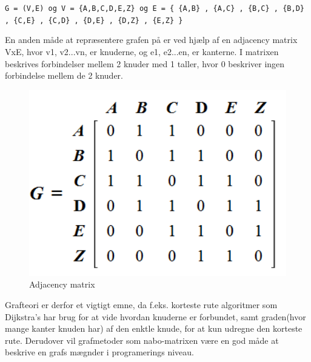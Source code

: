 \verb!G = (V,E) og V = {A,B,C,D,E,Z} og E = { {A,B} , {A,C} , {B,C} , {B,D} , {C,E} , {C,D} , {D,E} , {D,Z} , {E,Z} }!

\vspace{5mm}

En anden måde at repræsentere grafen på er ved hjælp af en adjacency matrix VxE, hvor v1, v2...vn, er knuderne, og e1, e2...en, er kanterne. I matrixen beskrives forbindelser mellem 2 knuder med 1 taller, hvor 0 beskriver ingen forbindelse mellem de 2 knuder.


\begin{figure}[H]
\begin{adjustbox}{width=1.2\textwidth,center=\textwidth}
\centering
\includegraphics[width=1.2\textwidth]{Pictures/Teoriafsnit/Figurfiler/Grafteori_matrix.png}
\end{adjustbox}
\caption{Adjacency matrix}
\label{fig:grafteori}
\end{figure}


Grafteori er derfor et vigtigt emne, da f.eks. korteste rute algoritmer som Dijkstra's har brug for at vide hvordan knuderne er forbundet, samt graden(hvor mange kanter knuden har) af den enktle knude, for at kun udregne den korteste rute. Derudover vil grafmetoder som nabo-matrixen være en god måde at beskrive en grafs mægnder i programerings niveau. 